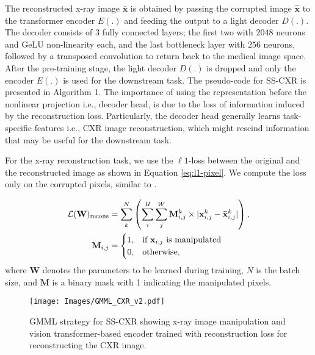 \documentclass[10pt,journal,compsoc]{IEEEtran}
\begin{document}
The reconstructed x-ray image $\mathbf{\bar{x}}$ is obtained by passing the corrupted image $\mathbf{\hat{x}}$ to the transformer encoder $E(.)$ and feeding the output to a light decoder $D(.)$. The decoder consists of 3 fully connected layers; the first two with $2048$ neurons and GeLU non-linearity each, and the last bottleneck layer with $256$ neurons, followed by a transposed convolution to return back to the medical image space. After the pre-training stage, the light decoder $D(.)$ is dropped and only the encoder $E(.)$ is used for the downstream task. The pseudo-code for SS-CXR is presented in Algorithm 1. The importance of using the representation before the nonlinear projection i.e., decoder head, is due to the loss of information induced by the reconstruction loss. Particularly, the decoder head generally learns task-specific features i.e., CXR image reconstruction, which might rescind information that may be useful for the downstream task.

For the x-ray reconstruction task, we use the $\ell1$-loss between the original and the reconstructed image as shown in Equation \ref{eq:l1-pixel}. We compute the loss only on the corrupted pixels, similar to \cite{devlin2018bert,atito2022gmml}.

\begin{align}
\label{eq:l1-pixel}
\mathcal{L}(\mathbf{W})_{\rm recons} &= \sum_k^N \left( \sum_i^H \sum_j^W \mathbf{M}_{i,j}^k \times | \mathbf{x}_{i,j}^k - \mathbf{\bar{x}}^k_{i,j} | \right),
\\
\mathbf{M}_{i,j} &= 
\begin{cases}
    1,              & \text{if } \mathbf{x}_{i,j} \text{ is manipulated}\\
    0,              & \text{otherwise,}
\end{cases}
\end{align}
where $\mathbf{W}$ denotes the parameters to be learned during training, $N$ is the batch size, and $\mathbf{M}$ is a binary mask with 1 indicating the manipulated pixels.
\begin{figure}[ht]
    \centering
    \texttt{[image: Images/GMML\_CXR\_v2.pdf]}
    \caption{GMML strategy for SS-CXR showing x-ray image manipulation and vision transformer-based encoder trained with reconstruction loss for reconstructing the CXR image.}
    \label{fig:GMMLtransformerarch}
\end{figure}
\end{document}
